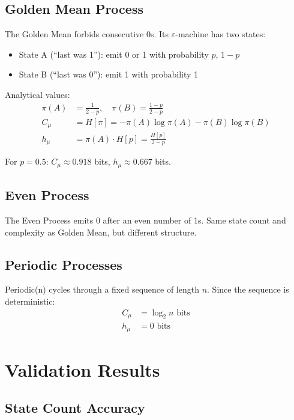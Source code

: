\documentclass[11pt,a4paper]{report}
\theoremstyle{definition}
\theoremstyle{plain}
\newcommand{\eps}{\varepsilon}
\newcommand{\Cmu}{C_\mu}
\newcommand{\hmu}{h_\mu}
\begin{document}
\subsection{Golden Mean Process}

The Golden Mean forbids consecutive 0s. Its $\eps$-machine has two states:
\begin{itemize}
    \item State A (``last was 1''): emit 0 or 1 with probability $p$, $1-p$
    \item State B (``last was 0''): emit 1 with probability 1
\end{itemize}

Analytical values:
\begin{align}
    \pi(A) &= \frac{1}{2-p}, \quad \pi(B) = \frac{1-p}{2-p} \\
    \Cmu &= H[\pi] = -\pi(A)\log\pi(A) - \pi(B)\log\pi(B) \\
    \hmu &= \pi(A) \cdot H[p] = \frac{H[p]}{2-p}
\end{align}

For $p = 0.5$: $\Cmu \approx 0.918$ bits, $\hmu \approx 0.667$ bits.

\subsection{Even Process}

The Even Process emits 0 after an even number of 1s. Same state count and complexity as Golden Mean, but different structure.

\subsection{Periodic Processes}

Periodic(n) cycles through a fixed sequence of length $n$. Since the sequence is deterministic:
\begin{align}
    \Cmu &= \log_2 n \text{ bits} \\
    \hmu &= 0 \text{ bits}
\end{align}

\section{Validation Results}

\subsection{State Count Accuracy}
\end{document}
